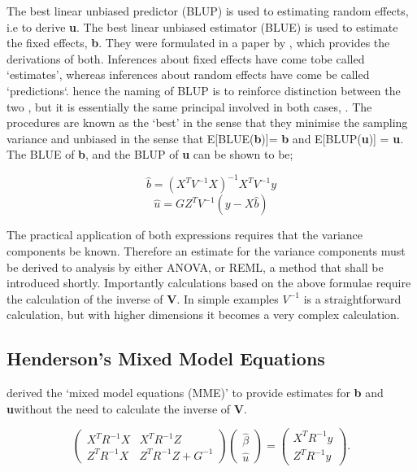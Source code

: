 \documentclass[12pt, a4paper]{report}
\begin{document}
The best linear unbiased predictor (BLUP) is used to estimating
random effects, i.e to derive \textbf{u}. The best linear unbiased
estimator (BLUE) is used to estimate the fixed effects,
\textbf{b}. They were formulated in a paper by \cite{Henderson59},
which provides the derivations of both. Inferences about fixed
effects have come tobe called `estimates', whereas inferences
about random effects have come be called `predictions`. hence the
naming of BLUP is to reinforce distinction between the two , but
it is essentially the same principal involved in both cases,
\citep{Robinson}. The procedures are known as the `best' in the
sense that they minimise the sampling variance and unbiased in the
sense that E[BLUE(\textbf{b})]= \textbf{b} and E[BLUP(\textbf{u})]
= \textbf{u}. The BLUE of \textbf{b}, and the BLUP of \textbf{u}
can be shown to be;

\begin{equation}
\hat{b} = (X^{T}V^{-1}X)^{-1}X^{T}V^{-1}y
\end{equation}
\begin{equation}
\hat{u} = GZ^{T}V^{-1}(y-X\hat{b})
\end{equation}

The practical application of both expressions requires that the
variance components be known. Therefore an estimate for the
variance components must be derived to analysis by either ANOVA,
or REML, a method that shall be introduced shortly. Importantly
calculations based on the above formulae require the calculation
of the inverse of \textbf{V}. In simple examples $V^{-1}$ is a
straightforward calculation, but with higher dimensions it becomes
a very complex calculation.



\subsection{Henderson's Mixed Model Equations}
\citet{Henderson50, Henderson63, Henderson73,
Henderson84a} derived the `mixed model equations (MME)' to provide
estimates for \textbf{b} and \textbf{u}without the need to
calculate the inverse of \textbf{V}.

\begin{equation}
\left(\begin{matrix}
X^{T}R^{-1}X  & X^{T}R^{-1}Z \\
Z^{T}R^{-1}X  & Z^{T}R^{-1}Z + G^{-1}
\end{matrix}\right) \left(\begin{array}{c}
\hat{\beta}  \\
\hat{u}\end{array} \right) = \left(  \begin{array}{c}
X^{T}R^{-1}y  \\
Z^{T}R^{-1}y  \end{array} \right).
\end{equation}
\end{document}
